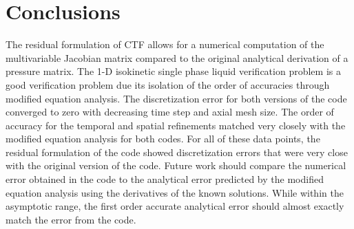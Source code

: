 \documentclass{mc2015}
\begin{document}
%
%
%
%
%
%
%
%

\section{Conclusions}

The residual formulation of CTF allows for a numerical computation of the
multivariable Jacobian matrix compared to the original analytical derivation of
a pressure matrix. The 1-D isokinetic single phase liquid verification problem
is a good verification problem due its isolation of the order
of accuracies through modified equation analysis. The discretization error for
both versions of the code converged to zero with decreasing time step and axial
mesh size. The order of accuracy for the temporal and spatial refinements
matched very closely with the modified equation analysis for both codes. For all
of these data points, the residual formulation of the code showed discretization
errors that were very close with the original version of the code. Future work
should compare the numerical error obtained in the code to the analytical
error predicted by the modified equation analysis using the derivatives of the
known solutions. While within the asymptotic range, the first order accurate
analytical error should almost exactly match the error from the code.
\end{document}
